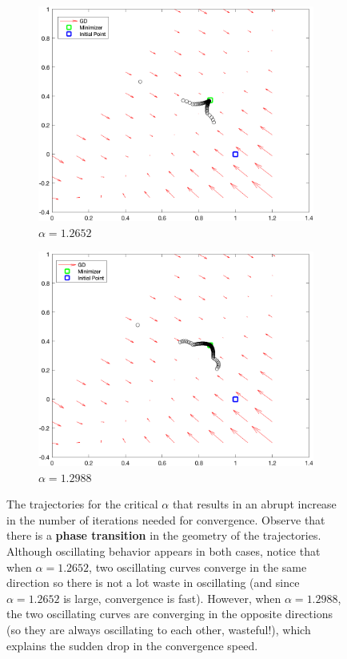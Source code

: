 \documentclass{article}
\begin{document}
\begin{figure} 
	\begin{subfigure}[b]{.5\linewidth}
		\centering\large 	\includegraphics[width=\linewidth]{figs/Q2_12652}
		\caption{$ \alpha = 1.2652 $}
	\end{subfigure}%
	\begin{subfigure}[b]{.515\linewidth}
		\centering\large 	\includegraphics[width=\linewidth]{figs/Q2_12988}
		\caption{$ \alpha = 1.2988 $}
	\end{subfigure}
	\caption{The trajectories for the critical $ \alpha $ that results in an abrupt increase in the number of iterations needed for convergence. Observe that there is a \textbf{phase transition} in the geometry of the trajectories. Although oscillating behavior appears in both cases, notice that when $ \alpha = 1.2652 $, two oscillating curves converge in the same direction so there is not a lot waste in oscillating (and since $ \alpha = 1.2652 $ is large, convergence is fast). However, when $ \alpha = 1.2988 $, the two oscillating curves are converging in the opposite directions (so they are always oscillating to each other, wasteful!), which explains the sudden drop in the convergence speed.}\label{fig: Q2_increase}
\end{figure}
\end{document}
